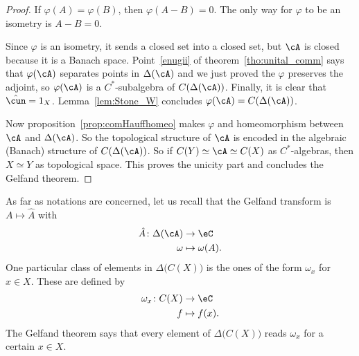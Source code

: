 \begin{proof}

If $\varphi(A)=\varphi(B)$, then $\varphi(A-B)=0$. The only way for $\varphi$ to be an isometry is $A-B=0$.


Since $\varphi$ is an isometry, it sends a closed set into a closed set, but $\cA$ is closed because it is a Banach space. Point~\ref{enugii} of theorem~\ref{tho:unital_comm} says that $\varphi(\cA)$ separates points in $\Delta(\cA)$ and we just proved the $\varphi$ preserves the adjoint, so $\varphi(\cA)$ is a $C^*$-subalgebra of $C(\Delta(\cA))$. Finally, it is clear that $\hat{\cun}=1_X$. Lemma~\ref{lem:Stone_W} concludes $\varphi(\cA)=C(\Delta(\cA))$.

Now proposition~\ref{prop:comHauffhomeo} makes $\varphi$ and homeomorphism between $\cA$ and $\Delta(\cA)$. So the topological structure of $\cA$ is encoded in the algebraic (Banach) structure of $C(\Delta(\cA))$. So if $C(Y)\simeq\cA\simeq C(X)$ as $C^*$-algebras, then $X\simeq Y$ as topological space. This proves the unicity part and concludes the Gelfand theorem.

\end{proof}

As far as notations are concerned, let us recall that the Gelfand transform is $A\mapsto\hat A$ with
\begin{equation}
\begin{aligned}
 \hat A\colon \Delta(\cA)&\to \eC \\
   \omega&\mapsto \omega(A).
\end{aligned}
\end{equation}
One particular class of elements in $\Delta\big( C(X) \big)$ is the ones of the form $\omega_x$ for $x\in X$. These are defined by
\begin{equation}
\begin{aligned}
 \omega_x\colon C(X)&\to \eC \\
   f&\mapsto f(x).
\end{aligned}
\end{equation}
The Gelfand theorem says that every element of $\Delta \big(C(X))$ reads $\omega_x$ for a certain $x\in X$.

